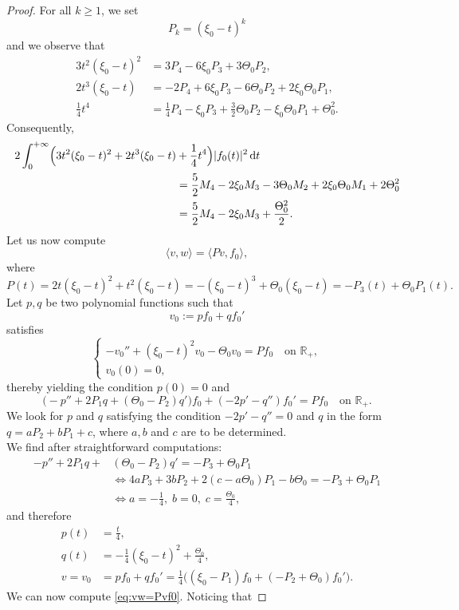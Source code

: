 \documentclass[10pt]{amsart}
\newcommand{\rd}{\,\mathrm{d}}
\theoremstyle{plain}
\theoremstyle{definition}
\newcommand{\R}{\mathbb{R}}
\begin{document}
\begin{proof}
For all $k\geq 1$, we set
\[
P_k=(\xi_0-t)^k
\]
and we observe that
\[
\begin{aligned}
3t^2(\xi_0-t)^2&=3P_4-6\xi_0P_3+3\Theta_0P_2,\\
2t^3(\xi_0-t)&=-2P_4+6\xi_0P_3-6\Theta_0P_2+2\xi_0\Theta_0P_1,\\
\frac14t^4&=\frac14P_4-\xi_0P_3+\frac32\Theta_0P_2-\xi_0\Theta_0P_1+\Theta_0^2.
\end{aligned}
\]
Consequently,
\begin{align*}
2\int_0^{+\infty} \Bigl(3t^2(\xi_0-t)^2+2t^3(\xi_0-t)&+\frac14t^4\Bigr)|f_0(t)|^2\rd t\\
&=\frac{5}2M_4-2\xi_0M_3-3\Theta_0M_2+2\xi_0\Theta_0M_1+2\Theta_0^2\\
&=\frac52M_4-2\xi_0M_3+\frac{\Theta_0^2}2.
\end{align*}
Let us now compute
\begin{equation}\label{eq:vw=Pvf0}
\langle v,w\rangle=\langle Pv,f_0\rangle,
\end{equation}
where
\[
P(t)=2t(\xi_0-t)^2+t^2(\xi_0-t)=-(\xi_0-t)^3+\Theta_0(\xi_0-t)=-P_3(t)+\Theta_0P_1(t).
\]
Let $p,q$ be two polynomial functions such that
\[
v_0:=pf_0+qf_0'
\]
satisfies
\[
\begin{cases}
-v_0''+(\xi_0-t)^2v_0-\Theta_0v_0=Pf_0\quad\text{on~}\R_+,\\
v_0(0)=0,
\end{cases}
\]
thereby yielding the condition $p(0)=0$ and
\[
\bigl(-p''+2P_1q+(\Theta_0-P_2)q' \bigr)f_0+(-2p'-q'')f_0'=Pf_0\quad\text{on~}\R_+.
\]
We look for $p$ and $q$ satisfying the condition $-2p'-q''=0$ and $q$ in the form $q=aP_2+bP_1+c$, where $a,b$ and $c$ are to be determined. \\
We find after straightforward computations:
\[
\begin{aligned}
-p''+2P_1q+&(\Theta_0-P_2)q'=-P_3+\Theta_0P_1\\
&\iff 4aP_3+3bP_2+2(c-a\Theta_0)P_1-b\Theta_0=-P_3+\Theta_0P_1\\
&\iff a=-\frac14,\;b=0,\;c=\frac{\Theta_0}4,
\end{aligned}
\]
and therefore\vspace*{-3pt}
\[
\begin{aligned}
p(t)&=\frac{t}4, \\ q(t)&=-\frac14(\xi_0-t)^2+\frac{\Theta_0}4,\\ v=v_0&=pf_0+qf_0'
=\frac14\bigl((\xi_0-P_1)f_0+(-P_2+\Theta_0)f_0' \bigr).
\end{aligned}
\]
We can now compute \eqref{eq:vw=Pvf0}. Noticing that\vspace*{-3pt}

\end{proof}
\end{document}
